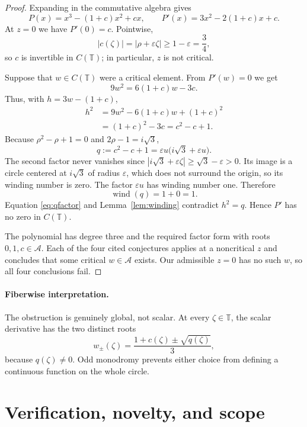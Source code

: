 \documentclass[11pt]{article}
\newcommand{\A}{\mathcal A}
\newcommand{\T}{\mathbb T}
\newcommand{\wind}{\operatorname{wind}}
\begin{document}
\begin{proof}
Expanding in the commutative algebra gives
\[
 P(x)=x^3-(1+c)x^2+cx,\qquad
 P'(x)=3x^2-2(1+c)x+c.
\]
At $z=0$ we have $P'(0)=c$.  Pointwise,
\[
              |c(\zeta)|=|\rho+\varepsilon\zeta|
                 \geq 1-\varepsilon=\frac34,
\]
so $c$ is invertible in $C(\T)$; in particular, $z$ is not critical.

Suppose that $w\in C(\T)$ were a critical element.  From $P'(w)=0$ we get
\[
 9w^2=6(1+c)w-3c.
\]
Thus, with $h=3w-(1+c)$,
\begin{align*}
 h^2
 &=9w^2-6(1+c)w+(1+c)^2 \\
 &=(1+c)^2-3c=c^2-c+1.
\end{align*}
Because $\rho^2-\rho+1=0$ and $2\rho-1=i\sqrt3$,
\begin{equation}\label{eq:qfactor}
 q:=c^2-c+1
   =\varepsilon u\bigl(i\sqrt3+\varepsilon u\bigr).
\end{equation}
The second factor never vanishes since
$|i\sqrt3+\varepsilon\zeta|\geq\sqrt3-\varepsilon>0$.
Its image is a circle centered at $i\sqrt3$ of radius $\varepsilon$, which
does not surround the origin, so its winding number is zero.  The factor
$\varepsilon u$ has winding number one.  Therefore
\[
                         \wind(q)=1+0=1.
\]
Equation \eqref{eq:qfactor} and Lemma~\ref{lem:winding} contradict $h^2=q$.
Hence $P'$ has no zero in $C(\T)$.

The polynomial has degree three and the required factor form with roots
$0,1,c\in\A$.  Each of the four cited conjectures applies at a noncritical
$z$ and concludes that some critical $w\in\A$ exists.  Our admissible
$z=0$ has no such $w$, so all four conclusions fail.
\end{proof}

\paragraph{Fiberwise interpretation.}
The obstruction is genuinely global, not scalar.  At every
$\zeta\in\T$, the scalar derivative has the two distinct roots
\[
 w_\pm(\zeta)=\frac{1+c(\zeta)\pm\sqrt{q(\zeta)}}3,
\]
because $q(\zeta)\neq0$.  Odd monodromy prevents either choice from defining
a continuous function on the whole circle.

\section{Verification, novelty, and scope}
\end{document}
